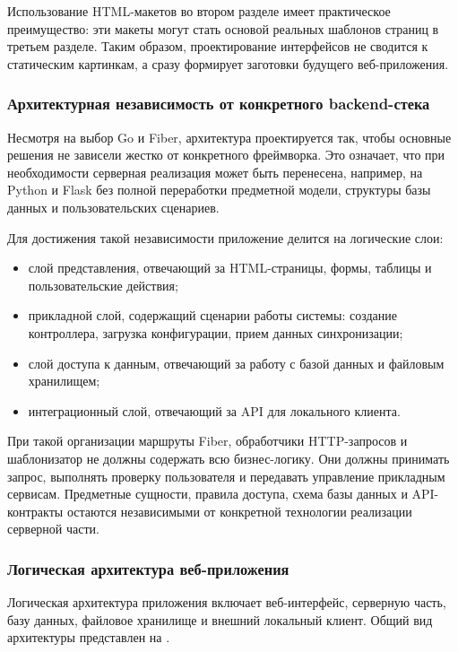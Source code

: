 Использование HTML-макетов во втором разделе имеет практическое преимущество:
эти макеты могут стать основой реальных шаблонов страниц в третьем разделе.
Таким образом, проектирование интерфейсов не сводится к статическим картинкам,
а сразу формирует заготовки будущего веб-приложения.

\subsubsection{Архитектурная независимость от конкретного backend-стека}

Несмотря на выбор Go и Fiber, архитектура проектируется так, чтобы основные
решения не зависели жестко от конкретного фреймворка. Это означает, что при
необходимости серверная реализация может быть перенесена, например, на Python и
Flask без полной переработки предметной модели, структуры базы данных и
пользовательских сценариев.

Для достижения такой независимости приложение делится на логические слои:
\begin{itemize}
    \item слой представления, отвечающий за HTML-страницы, формы, таблицы и пользовательские действия;
    \item прикладной слой, содержащий сценарии работы системы: создание контроллера, загрузка конфигурации, прием данных синхронизации;
    \item слой доступа к данным, отвечающий за работу с базой данных и файловым хранилищем;
    \item интеграционный слой, отвечающий за API для локального клиента.
\end{itemize}

При такой организации маршруты Fiber, обработчики HTTP-запросов и шаблонизатор
не должны содержать всю бизнес-логику. Они должны принимать запрос, выполнять
проверку пользователя и передавать управление прикладным сервисам. Предметные
сущности, правила доступа, схема базы данных и API-контракты остаются
независимыми от конкретной технологии реализации серверной части.

\subsubsection{Логическая архитектура веб-приложения}

Логическая архитектура приложения включает веб-интерфейс, серверную часть, базу
данных, файловое хранилище и внешний локальный клиент. Общий вид архитектуры
представлен на .

